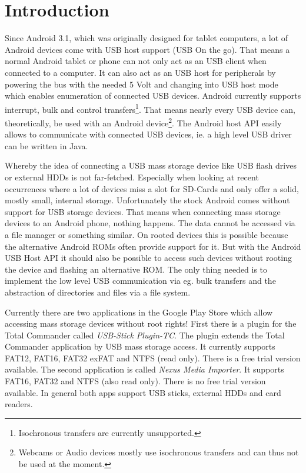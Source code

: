 \chapter{Introduction}
\label{chapter:Introduction}

Since Android 3.1, which was originally designed for tablet computers, a lot of Android devices come with USB host support (USB On the go). That means a normal Android tablet or phone can not only act as an USB client when connected to a computer. It can also act as an USB host for peripherals by powering the bus with the needed 5 Volt and changing into USB host mode which enables enumeration of connected USB devices\cite{android_usb_host}. Android currently supports interrupt, bulk and control transfers\footnote{Isochronous transfers are currently unsupported\cite{android_usb_constants}.}. That means nearly every USB device can, theoretically, be used with an Android device\footnote{Webcams or Audio devices mostly use isochronous transfers and can thus not be used at the moment.}. The Android host API easily allows to communicate with connected USB devices, ie. a high level USB driver can be written in Java.

Whereby the idea of connecting a USB mass storage device like USB flash drives or external HDDs is not far-fetched. Especially when looking at recent occurrences where a lot of devices miss a slot for SD-Cards and only offer a solid, mostly small, internal storage. Unfortunately the stock Android comes without support for USB storage devices. That means when connecting mass storage devices to an Android phone, nothing happens. The data cannot be accessed via a file manager or something similar. On rooted devices this is possible because the alternative Android ROMs often provide support for it. But with the Android USB Host API it should also be possible to access such devices without rooting the device and flashing an alternative ROM. The only thing needed is to implement the low level USB communication via eg. bulk transfers and the abstraction of directories and files via a file system.

Currently there are two applications in the Google Play Store which allow accessing mass storage devices without root rights! First there is a plugin for the Total Commander called \textit{USB-Stick Plugin-TC}. The plugin extends the Total Commander application by USB mass storage access. It currently supports FAT12, FAT16, FAT32 exFAT and NTFS (read only). There is a free trial version available. The second application is called \textit{Nexus Media Importer}. It supports FAT16, FAT32 and NTFS (also read only). There is no free trial version available. In general both apps support USB sticks, external HDDs and card readers.

